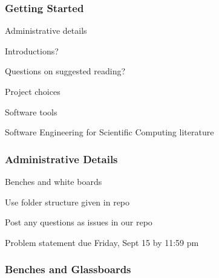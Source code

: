 \documentclass[t,12pt,numbers,fleqn]{beamer}
\begin{document}




\begin{frame}
\frametitle{Getting Started}

\bi
\item Administrative details
\item Introductions?
\item Questions on suggested reading?
\item Project choices
\item Software tools
\item Software Engineering for Scientific Computing literature
\ei

\end{frame}


\begin{frame}
\frametitle{Administrative Details}

\bi
\item Benches and white boards
\item Use folder structure given in repo
\item Post any questions as issues in our repo
\item Problem statement due Friday, Sept 15 by 11:59 pm
\ei

\end{frame}


\begin{frame}
\frametitle{Benches and Glassboards}


\end{frame}

\end{document}
